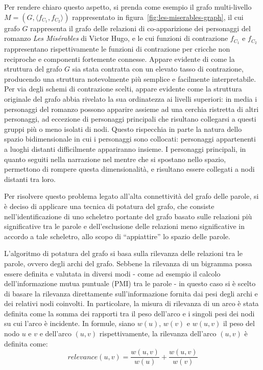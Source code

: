 Per rendere chiaro questo aspetto, si prenda come esempio il grafo multi-livello $M = (G, \langle f_{C_1}, f_{C_2}\rangle)$
rappresentato in figura~\ref{fig:les-miserables-graph}, il cui grafo $G$ rappresenta il grafo delle relazioni di
co-apparizione dei personaggi del romanzo \textit{Les Misérables} di Victor Hugo,
e le cui funzioni di contrazione $f_{C_1}$ e $f_{C_2}$ rappresentano rispettivamente le funzioni di contrazione
per cricche non reciproche e componenti fortemente connesse.
Appare evidente di come la struttura del grafo $G$ sia stata contratta con un elevato tasso di contrazione,
producendo una struttura notevolmente più semplice e facilmente interpretabile. Per via degli schemi di
contrazione scelti, appare evidente come la struttura originale del grafo abbia rivelato la sua ordinatezza ai livelli
superiori: in media i personaggi del romanzo possono apparire assieme ad una cerchia ristretta di altri personaggi,
ad eccezione di personaggi principali che risultano collegarsi a questi gruppi più o meno isolati di nodi.
Questo rispecchia in parte la natura dello spazio bidimensionale in cui i personaggi sono collocati: personaggi
appartenenti a luoghi distanti difficilmente appariranno insieme. I personaggi principali, in quanto seguiti
nella narrazione nel mentre che si spostano nello spazio, permettono di rompere questa dimensionalità, e risultano
essere collegati a nodi distanti tra loro. \newline

Per risolvere questo problema legato all'alta connettività del grafo delle parole, si è deciso di applicare
una tecnica di potatura del grafo, che consiste nell'identificazione di uno scheletro portante del grafo
basato sulle relazioni più significative tra le parole e dell'esclusione delle relazioni meno significative in
accordo a tale scheletro, allo scopo di ``appiattire'' lo spazio delle parole.


L'algoritmo di potatura del grafo si basa sulla rilevanza delle relazioni tra le parole, ovvero degli archi del grafo.
Sebbene la rilevanza di un bigramma possa essere definita e valutata in diversi modi - come ad esempio il calcolo
dell'informazione mutua puntuale (PMI) tra le parole - in questo caso si è scelto di basare la rilevanza
direttamente sull'informazione fornita dai pesi degli archi e dei relativi nodi coinvolti.
In particolare, la misura di rilevanza di un arco è stata definita come la somma dei rapporti tra il peso dell'arco
e i singoli pesi dei nodi su cui l'arco è incidente.
In formule, siano $w(u)$, $w(v)$ e $w(u, v)$ il peso del nodo $u$ e $v$ e dell'arco $(u, v)$ rispettivamente,
la rilevanza dell'arco $(u, v)$ è definita come:
\begin{equation*}
    relevance(u, v) = \frac{w(u, v)}{w(u)} + \frac{w(u, v)}{w(v)}
\end{equation*}


